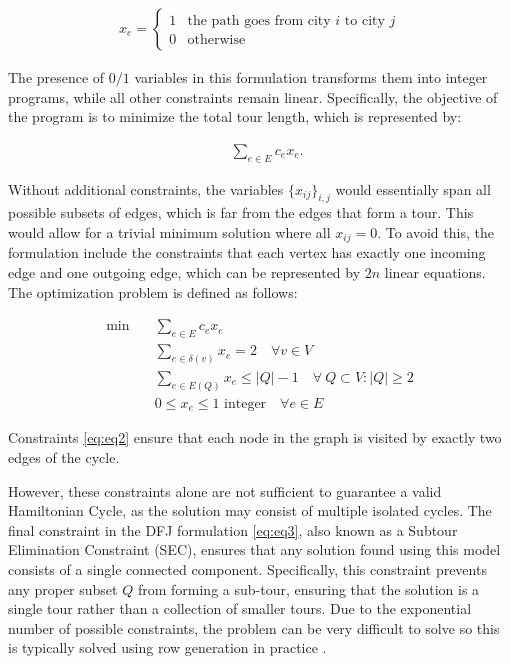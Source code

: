 \begin{align}
    x_{e} = 
    \begin{cases}
        1 & \text{the path goes from city $i$ to city $j$} \\
        0 & \text{otherwise}
    \end{cases}
\end{align}

The presence of $0/1$ variables in this formulation transforms them into integer programs, while all other constraints remain linear. Specifically, the objective of the program is to minimize the total tour length, which is represented by:

\begin{align}
    \quad \sum_{e \in E} c_e x_e.
\end{align}

Without additional constraints, the variables $\{x_{ij}\}_{i,j}$ would essentially span all possible subsets of edges, which is far from the edges that form a tour. This would allow for a trivial minimum solution where all $x_{ij} = 0$. To avoid this, the formulation include the constraints that each vertex has exactly one incoming edge and one outgoing edge, which can be represented by $2n$ linear equations.
The optimization problem is defined as follows:

\begin{align}
    \text{min} \quad & \sum_{e \in E} c_e x_e \label{eq:eq1}\\ 
    \quad & \sum_{e \in \delta(v)} x_{e} = 2 \quad \forall v \in V \label{eq:eq2}\\
    & \sum_{e \in E(Q)} x_{e} \leq |Q| - 1 \quad \forall \ Q \subset V:|Q| \geq 2 \label{eq:eq3}\\
    & 0 \leq x_e \leq 1 \text{ integer} \quad \forall e \in E \label{eq:eq4}
\end{align}

\noindent Constraints \ref{eq:eq2} ensure that each node in the graph is visited by exactly two edges of the cycle. 

\newpage

\noindent However, these constraints alone are not sufficient to guarantee a valid Hamiltonian Cycle, as the solution may consist of multiple isolated cycles. The final constraint in the DFJ formulation \ref{eq:eq3}, also known as a Subtour Elimination Constraint (SEC), ensures that any solution found using this model consists of a single connected component. Specifically, this constraint prevents any proper subset \( Q \) from forming a sub-tour, ensuring that the solution is a single tour rather than a collection of smaller tours. Due to the exponential number of possible constraints, the problem can be very difficult to solve so this is typically solved using row generation in practice \cite{wiki:TSP}.